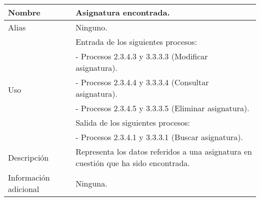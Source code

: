 \begin{center}
  \begin{tabular}{| l | p{9cm} |}
    \hline
    Nombre & \textbf{Asignatura encontrada}.\\
    \hline
    Alias & Ninguno.\\
    \hline
    \multirow{6}{*}{Uso} & Entrada de los siguientes procesos:\\
                         & - Procesos 2.3.4.3 y 3.3.3.3 (Modificar asignatura).\\
                         & - Procesos 2.3.4.4 y 3.3.3.4 (Consultar asignatura).\\
                         & - Procesos 2.3.4.5 y 3.3.3.5 (Eliminar asignatura).\\
                         & Salida de los siguientes procesos:\\
                         & - Procesos 2.3.4.1 y 3.3.3.1 (Buscar asignatura).\\
    \hline
    Descripción & Representa los datos referidos a una asignatura en cuestión
                  que ha sido encontrada.\\
    \hline
    Información adicional & Ninguna.\\
    \hline
  \end{tabular}
\end{center}

